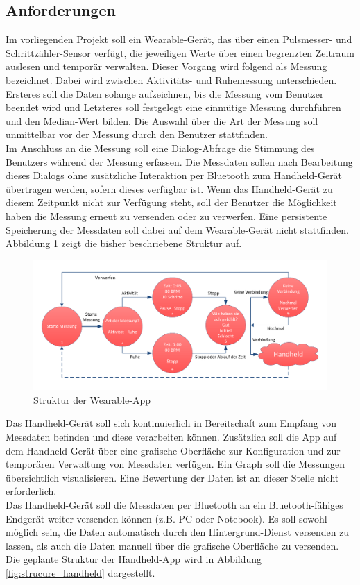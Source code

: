 \subsection{Anforderungen}
Im vorliegenden Projekt soll ein Wearable-Gerät, das über einen Pulsmesser- und Schrittzähler-Sensor verfügt, die jeweiligen Werte über einen begrenzten Zeitraum auslesen und temporär verwalten. Dieser Vorgang wird folgend als Messung bezeichnet. Dabei wird zwischen Aktivitäts- und Ruhemessung unterschieden. Ersteres soll die Daten solange aufzeichnen, bis die Messung vom Benutzer beendet wird und Letzteres soll festgelegt eine einmütige Messung durchführen und den Median-Wert bilden. Die Auswahl über die Art der Messung soll unmittelbar vor der Messung durch den Benutzer stattfinden.
\\[0.5cm]
Im Anschluss an die Messung soll eine Dialog-Abfrage die Stimmung des Benutzers während der Messung erfassen. Die Messdaten sollen nach Bearbeitung dieses Dialogs ohne zusätzliche Interaktion per Bluetooth zum Handheld-Gerät übertragen werden, sofern dieses verfügbar ist. Wenn das Handheld-Gerät zu diesem Zeitpunkt nicht zur Verfügung steht, soll der Benutzer die Möglichkeit haben die Messung erneut zu versenden oder zu verwerfen. Eine persistente Speicherung der Messdaten soll dabei auf dem Wearable-Gerät nicht stattfinden. Abbildung \ref{fig:structure_wearable} zeigt die bisher beschriebene Struktur auf.

\bigskip
\begin{figure}[H]
	\centering
	\includegraphics[scale=0.65]{images/structure_wearable.pdf}
	\caption{Struktur der Wearable-App}
	\label{fig:structure_wearable}
\end{figure}
\bigskip

Das Handheld-Gerät soll sich kontinuierlich in Bereitschaft zum Empfang von Messdaten befinden und diese verarbeiten können. Zusätzlich soll die App auf dem Handheld-Gerät über eine grafische Oberfläche zur Konfiguration und zur temporären Verwaltung von Messdaten verfügen. Ein Graph soll die Messungen übersichtlich visualisieren. Eine Bewertung der Daten ist an dieser Stelle nicht erforderlich.
\\[0.5cm] 
Das Handheld-Gerät soll die Messdaten per Bluetooth an ein Bluetooth-fähiges Endgerät weiter versenden können (z.B. PC oder Notebook). Es soll sowohl möglich sein, die Daten automatisch durch den Hintergrund-Dienst versenden zu lassen, als auch die Daten manuell über die grafische Oberfläche zu versenden. Die geplante Struktur der Handheld-App wird in Abbildung \ref{fig:strucure_handheld} dargestellt.

